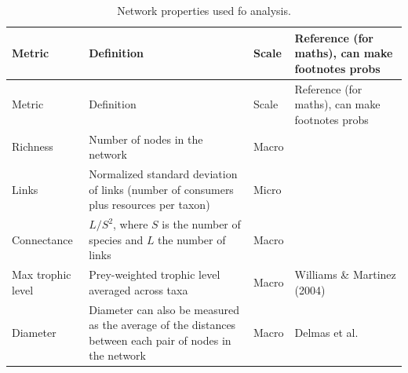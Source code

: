 \documentclass[
]{article}
\begin{document}
\begin{longtable}[]{@{}
  >{\raggedright\arraybackslash}p{}
  >{\raggedright\arraybackslash}p{}
  >{\raggedright\arraybackslash}p{}
  >{\raggedright\arraybackslash}p{}@{}}
\caption{Network properties used fo
analysis.}\label{tbl-properties}\tabularnewline
\toprule\noalign{}
\begin{minipage}[b]{\linewidth}\raggedright
Metric
\end{minipage} & \begin{minipage}[b]{\linewidth}\raggedright
Definition
\end{minipage} & \begin{minipage}[b]{\linewidth}\raggedright
Scale
\end{minipage} & \begin{minipage}[b]{\linewidth}\raggedright
Reference (for maths), can make footnotes probs
\end{minipage} \\
\midrule\noalign{}
\endfirsthead
\toprule\noalign{}
\begin{minipage}[b]{\linewidth}\raggedright
Metric
\end{minipage} & \begin{minipage}[b]{\linewidth}\raggedright
Definition
\end{minipage} & \begin{minipage}[b]{\linewidth}\raggedright
Scale
\end{minipage} & \begin{minipage}[b]{\linewidth}\raggedright
Reference (for maths), can make footnotes probs
\end{minipage} \\
\midrule\noalign{}
\endhead
\bottomrule\noalign{}
\endlastfoot
Richness & Number of nodes in the network & Macro & \\
Links & Normalized standard deviation of links (number of consumers plus
resources per taxon) & Micro & \\
Connectance & \(L/S^2\), where \(S\) is the number of species and \(L\)
the number of links & Macro & \\
Max trophic level & Prey-weighted trophic level averaged across taxa &
Macro & Williams \& Martinez (2004) \\
Diameter & Diameter can also be measured as the average of the distances
between each pair of nodes in the network & Macro & Delmas et al.

\end{longtable}
\end{document}
